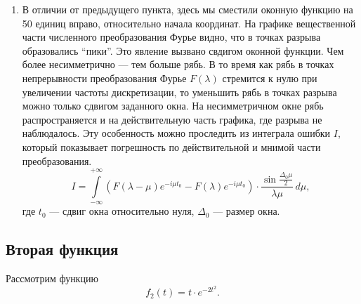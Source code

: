 \documentclass[a4paper, 11pt]{article}
\newcommand{\myint}[4]{\int\limits_{#1}^{#2}#3\,d#4}
\begin{document}
\begin{enumerate}
            \begin{enumerate}
                \item
                     В отличии от предыдущего пункта, здесь мы сместили оконную функцию на 50 единиц вправо, относительно начала координат. На графике вещественной части численного преобразования Фурье видно, что в точках разрыва образовались “пики”. Это явление вызвано свдигом оконной функции. Чем более несимметрично --- тем больше рябь. В то время как рябь в точках непрерывности преобразования Фурье $F(\lambda)$ стремится к нулю при увеличении частоты дискретизации, то уменьшить рябь в точках разрыва можно только сдвигом заданного окна. На несимметричном окне рябь распространяется и на действительную часть графика, где разрыва не наблюдалось. Эту особенность можно проследить из интеграла ошибки $I$, который показывает погрешность по действительной и мнимой части преобразования.
                    $$
                        I = \myint{-\infty}{+\infty}{\left( F(\lambda - \mu) e^{-i\mu t_0} - F(\lambda)e^{-i\mu t_0}\right) \cdot \frac{\sin{\frac{\Delta_0\mu}{2}}}{\lambda\mu}}{\mu},
                    $$
                    где $t_0$ --- сдвиг окна относительно нуля, $\Delta_0$ --- размер окна.
            \end{enumerate}
    \end{enumerate}
    
    \subsection{Вторая функция}
        Рассмотрим функцию
        $$
            f_2(t) = t \cdot e^{-2t^2}.        
        $$  
        
\end{document}
